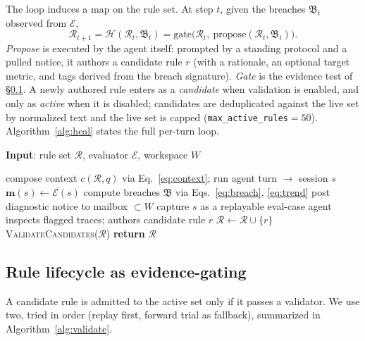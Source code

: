 \documentclass[letterpaper]{article} %
\newcommand{\Rset}{\mathcal{R}}                   %
\newcommand{\evalfn}{\mathcal{E}}                 %
\newcommand{\mvec}{\mathbf{m}}                    %
\newcommand{\Heal}{\mathcal{H}}                   %
\newcommand{\Breach}{\mathfrak{B}}                %
\begin{document}
The loop induces a map on the rule set. At step $t$, given the breaches $\Breach_t$ observed
from $\evalfn$,
\begin{equation}
  \Rset_{t+1} = \Heal(\Rset_t,\Breach_t) = \mathrm{gate}\bigl(\Rset_t,\ \mathrm{propose}(\Rset_t,\Breach_t)\bigr).
  \label{eq:heal}
\end{equation}
\emph{Propose} is executed by the agent itself: prompted by a standing protocol and a pulled
notice, it authors a candidate rule $r$ (with a rationale, an optional target metric, and tags
derived from the breach signature). \emph{Gate} is the evidence test of \S\ref{sec:validate}. A
newly authored rule enters as a \emph{candidate} when validation is enabled, and only as
\emph{active} when it is disabled; candidates are deduplicated against the live set by
normalized text and the live set is capped (\texttt{max\_active\_rules}$=50$).
Algorithm~\ref{alg:heal} states the full per-turn loop.

\begin{algorithm}[t]
\caption{Self-Heal Loop (per turn / task)}
\label{alg:heal}
\textbf{Input}: rule set $\Rset$, evaluator $\evalfn$, workspace $W$
\begin{algorithmic}[1]
\STATE compose context $c(\Rset,q)$ via Eq.~\eqref{eq:context}; run agent turn $\to$ session $s$
\STATE $\mvec(s) \gets \evalfn(s)$ 
\STATE compute breaches $\Breach$ via Eqs.~\eqref{eq:breach}, \eqref{eq:trend}
\IF{$\Breach \neq \varnothing$ and not deduplicated/cooled-down}
    \STATE post diagnostic notice to mailbox $\subset W$
        \STATE capture $s$ as a replayable eval-case
    \ENDIF
\ENDIF
\STATE {}
    \STATE agent inspects flagged traces; authors candidate rule $r$
    \STATE $\Rset \gets \Rset \cup \{r\}$ 
\ENDIF
\STATE \textsc{ValidateCandidates}($\Rset$) 
\STATE \textbf{return} $\Rset$
\end{algorithmic}
\end{algorithm}

\subsection{Rule lifecycle as evidence-gating}
\label{sec:validate}

A candidate rule is admitted to the active set only if it passes a validator. We use two, tried
in order (replay first, forward trial as fallback), summarized in Algorithm~\ref{alg:validate}.
\end{document}
